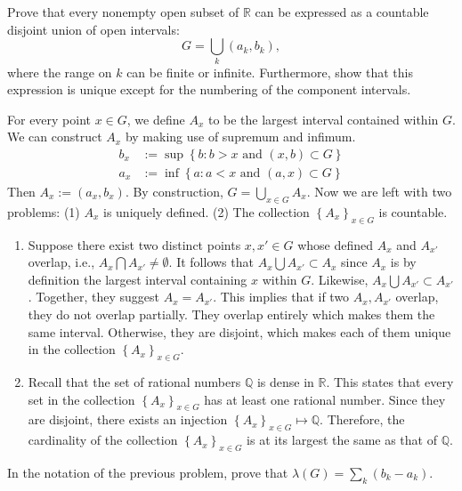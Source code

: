 \documentclass[answers]{exam}
\begin{document}
\begin{questions}
   Prove that every nonempty open subset of $\mathbb{R}$ can be expressed as a countable disjoint union of open intervals:
   $$
      G = \bigcup\limits_{k} \left(a_{k}, b_{k}\right),
   $$
   where the range on $k$ can be finite or infinite. Furthermore, show that this expression is unique except for the numbering of the component intervals.
   \begin{solution}
      For every point $x \in G$, we define $A_{x}$ to be the largest interval contained within $G$. We can construct $A_{x}$ by making use of supremum and infimum.
      \begin{align*}
         b_{x} &:= \sup\left\{b: b>x \text{ and } \left(x,b\right) \subset G \right\}\\
         a_{x} &:= \inf \left\{a: a < x \text{ and } \left(a, x\right) \subset G \right\}
      \end{align*}
      Then $A_{x} := \left(a_{x}, b_{x}\right)$. By construction, $G = \bigcup_{x\in G} A_{x}$. Now we are left with two problems: (1) $A_{x}$ is uniquely defined. (2) The collection $\left\{A_{x} \right\}_{x\in G}$ is countable.
      \begin{enumerate}
         \item Suppose there exist two distinct points $x,x' \in G$ whose defined $A_{x}$ and $A_{x'}$ overlap, i.e., $A_{x} \bigcap A_{x'} \neq \emptyset$. It follows that $A_{x} \bigcup A_{x'} \subset A_{x}$ since $A_{x}$ is by definition the largest interval containing $x$ within $G$. Likewise, $A_{x} \bigcup A_{x'} \subset A_{x'}$. Together, they suggest $A_{x} = A_{x'}$. This implies that if two $A_{x}, A_{x'}$ overlap, they do not overlap partially. They overlap entirely which makes them the same interval. Otherwise, they are disjoint, which makes each of them unique in the collection $\left\{A_{x} \right\}_{x\in G}$.
         \item Recall that the set of rational numbers $\mathbb{Q}$ is dense in $\mathbb{R}$. This states that every set in the collection $\left\{A_{x} \right\}_{x\in G}$ has at least one rational number. Since they are disjoint, there exists an injection $\left\{A_{x} \right\}_{x\in G} \mapsto \mathbb{Q}$. Therefore, the cardinality of the collection $\left\{A_{x} \right\}_{x\in G}$ is at its largest the same as that of $\mathbb{Q}$. 
      \end{enumerate}
   \end{solution}
   \question
   In the notation of the previous problem, prove that $\lambda\left(G\right) = \sum_{k} \left(b_{k}-a_{k}\right)$.

\end{questions}
\end{document}
